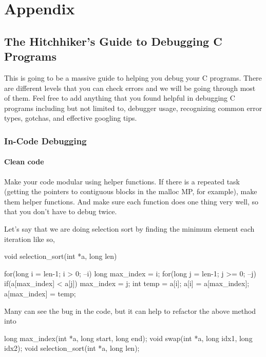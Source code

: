 \chapter{Appendix}

\section{The Hitchhiker's Guide to Debugging C Programs}

This is going to be a massive guide to helping you debug your C programs. There are different levels that you can check errors and we will be going through most of them. Feel free to add anything that you found helpful in debugging C programs including but not limited to, debugger usage, recognizing common error types, gotchas, and effective googling tips.

\subsection{In-Code Debugging}

\subsubsection{Clean code}

Make your code modular using helper functions. If there is a repeated task (getting the pointers to contiguous blocks in the malloc MP, for example), make them helper functions. And make sure each function does one thing very well, so that you don't have to debug twice.

Let's say that we are doing selection sort by finding the minimum element each iteration like so,

\begin{code}[language=C]
void selection_sort(int *a, long len){
     for(long i = len-1; i > 0; --i){
         long max_index = i;
         for(long j = len-1; j >= 0; --j){
             if(a[max_index] < a[j]){
                  max_index = j;
             }
         }
         int temp = a[i];
         a[i] = a[max_index];
         a[max_index] = temp;
     }

}
\end{code}

Many can see the bug in the code, but it can help to refactor the above
method into

\begin{code}[language=C]
long max_index(int *a, long start, long end);
void swap(int *a, long idx1, long idx2);
void selection_sort(int *a, long len);
\end{code}


